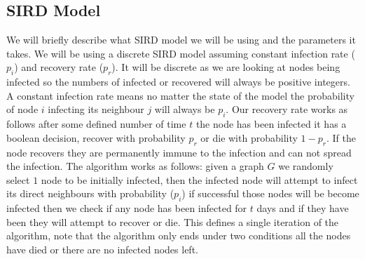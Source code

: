 \documentclass{article}
\begin{document}
        \subsection{SIRD Model}
        We will briefly describe what SIRD model we will be using and the parameters it takes. We will be using a discrete SIRD model assuming constant infection rate ($p_i$) and recovery rate ($p_r$). It will be discrete as we are looking at nodes being infected so the numbers of infected or recovered will always be positive integers. A constant infection rate means no matter the state of the model the probability of node $i$ infecting its neighbour $j$ will always be $p_i$. Our recovery rate works as follows after some defined number of time $t$ the node has been infected it has a boolean decision, recover with probability $p_r$ or die with probability $1-p_r$. If the node recovers they are permanently immune to the infection and can not spread the infection. The algorithm works as follows: given a graph $G$ we randomly select $1$ node to be initially infected, then the infected node will attempt to infect its direct neighbours with probability ($p_i$) if successful those nodes will be become infected then we check if any node has been infected for $t$ days and if they have been they will attempt to recover or die. This defines a single iteration of the algorithm, note that the algorithm only ends under two conditions all the nodes have died or there are no infected nodes left.
\end{document}
